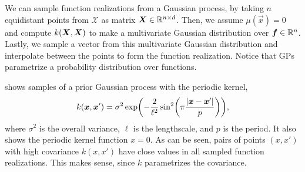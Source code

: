 We can sample function realizations from a Gaussian process, by taking $n$
equidistant points from $\mathcal{X}$ as matrix $\bm{X}\in\mathbb{R}^{n\times d}$.
Then, we assume $\mu(\vec{x}) = 0$ and compute $k(\bm{X},\bm{X})$ to make a
multivariate Gaussian distribution over $\bm{f}\in\mathbb{R}^n$. Lastly, we sample a
vector from this multivariate Gaussian distribution and interpolate between the
points to form the function realization. Notice that GPs parametrize a
probability distribution over functions.

 shows samples of a prior Gaussian process with the periodic
kernel, \[
  k(\vec{x},\vec{x}') = \sigma^2 \exp \lft( -\frac{2}{\ell^2}\sin^2\lft(\pi
  \frac{|\vec{x}-\vec{x}'|}{p} \rgt) \rgt)
,\]
where $\sigma^2$ is the overall variance, $\ell$ is the lengthscale, and $p$ is
the period. It also shows the periodic kernel function \wrt $x=0$. As can be
seen, pairs of points $(x,x')$ with high covariance $k(x,x')$ have close values
in all sampled function realizations. This makes sense, since $k$ parametrizes
the covariance.

